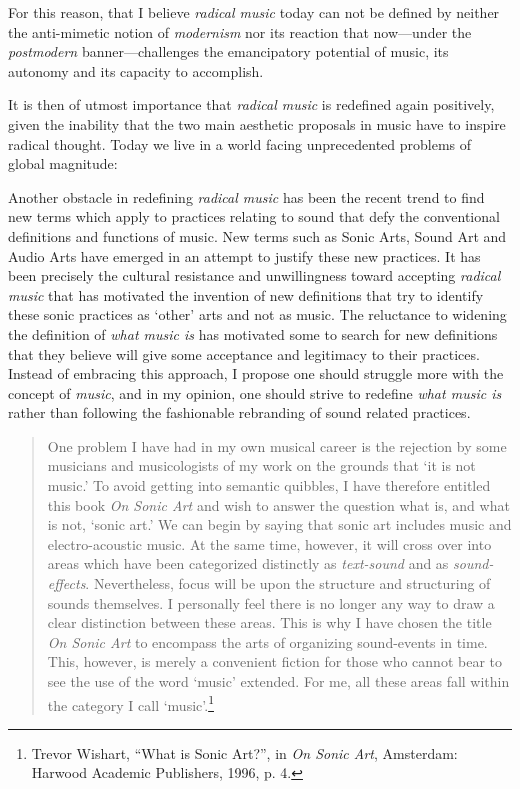 For this reason, that I believe \emph{radical music} today can not be defined by neither the anti-mimetic notion of \emph{modernism} nor its reaction that now---under the \emph{postmodern} banner---challenges the emancipatory potential of music, its autonomy and its capacity to accomplish. 

It is then of utmost importance that \emph{radical music} is redefined again positively, given the inability that the two main aesthetic proposals in music have to inspire radical thought. Today we live in a world facing unprecedented problems of global magnitude:


Another obstacle in redefining \emph{radical music} has been the recent trend to find new terms which apply to practices relating to sound that defy the conventional definitions and functions of music. New terms such as Sonic Arts, Sound Art and Audio Arts have emerged in an attempt to justify these new practices. It has been precisely the cultural resistance and unwillingness toward accepting \emph{radical music} that has motivated the invention of new definitions that try to identify these sonic practices as `other' arts and not as music. The reluctance to widening the definition of \emph{what music is} has motivated some to search for new definitions that they believe will give some acceptance and legitimacy to their practices. Instead of embracing this approach, I propose one should struggle more with the concept of \emph{music}, and in my opinion, one should strive to redefine \emph{what music is} rather than following the fashionable rebranding of sound related practices. 

\begin{quote}
One problem I have had in my own musical career is the rejection by some musicians and musicologists of my work on the grounds that `it is not music.' To avoid getting into semantic quibbles, I have therefore entitled this book \emph{On Sonic Art} and wish to answer the question what is, and what is not, `sonic art.' We can begin by saying that sonic art includes music and electro-acoustic music. At the same time, however, it will cross over into areas which have been categorized distinctly as \emph{text-sound} and as \emph{sound-effects}. Nevertheless, focus will be upon the structure and structuring of sounds themselves. I personally feel there is no longer any way to draw a clear distinction between these areas. This is why I have chosen the title \emph{On Sonic Art} to encompass the arts of organizing sound-events in time. This, however, is merely a convenient fiction for those who cannot bear to see the use of the word `music' extended. For me, all these areas fall within the category I call `music'.\footnote{Trevor Wishart, ``What is Sonic Art?'', in \emph{On Sonic Art}, Amsterdam: Harwood Academic Publishers, 1996, p. 4.}
\end{quote}

